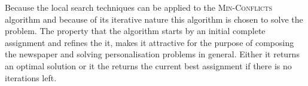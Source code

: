 Because the local search techniques can be applied to the \textsc{Min-Conflicts} algorithm and because of its iterative nature this algorithm is chosen to solve the problem. The property that the algorithm starts by an initial complete assignment and refines the it, makes it attractive for the purpose of composing the newspaper and solving personalisation problems in general. Either it returns an optimal solution or it the returns the current best assignment if there is no iterations left.

%
%
%
%
%
%
